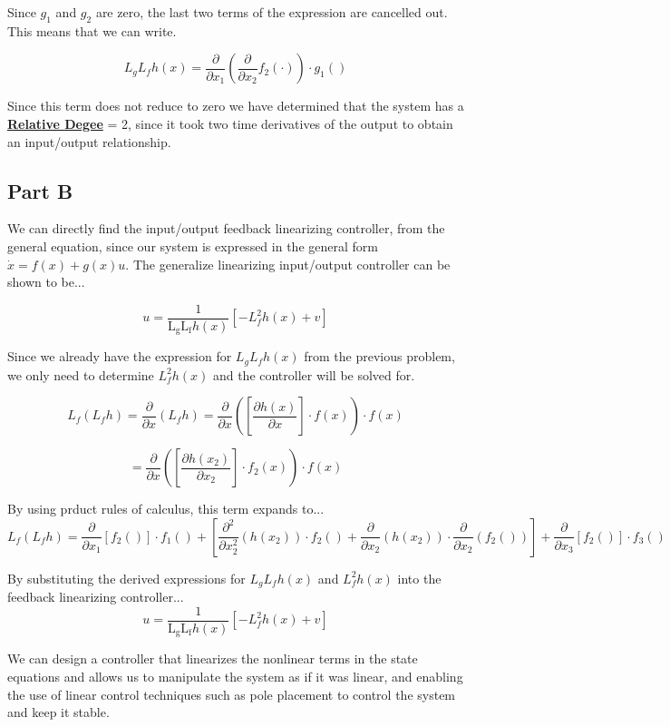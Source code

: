 \noindent Since $g_1$ and $g_2$ are zero, the last two terms of the expression are cancelled out. This means that we can write.

$$
L_gL_fh(x) = \frac{\partial}{\partial x_1}(\frac{\partial}{\partial x_2}f_2(\cdot))\cdot g_1()
$$

\noindent Since this term does not reduce to zero we have determined that the system has a \underline{\textbf{Relative Degee}} = 2, since it took two time derivatives of the output to obtain an input/output relationship.


\subsection*{Part B}

We can directly find the input/output feedback linearizing controller, from the general equation, since our system is expressed in the general form $\dot{x} = f(x) + g(x)u$. The generalize linearizing input/output controller can be shown to be...


$$
u=\frac{1}{\operatorname{L_g} \operatorname{L_f} h(x)}\left[-L^{2}_f h(x) + v\right]
$$


\noindent Since we already have the expression for $L_gL_fh(x)$ from the previous problem, we only need to determine $L^2_fh(x)$ and the controller will be solved for.

$$
L_{f}\left(L_{f} h\right)=\frac{\partial}{\partial x}\left(L_{f} h\right)=\frac{\partial}{\partial x}\left(\left[\frac{\partial h(x)}{\partial x}\right] \cdot f(x)\right) \cdot f(x)
$$


$$
= \frac{\partial}{\partial x}\left(\left[\frac{\partial h(x_2)}{\partial x_2}\right] \cdot f_2(x)\right) \cdot f(x)
$$

\noindent By using prduct rules of calculus, this term expands to...
$$
L_{f}\left(L_{f} h\right) =  \frac{\partial}{\partial x_1} \left[ f_2() \right]\cdot f_1() +  \left[ \frac{\partial^2}{\partial x_2^2} (h(x_2))\cdot f_2() + \frac{\partial}{\partial x_2} (h(x_2))\cdot \frac{\partial}{\partial x_2}(f_2()) \right]  + \frac{\partial}{\partial x_3} \left[ f_2() \right] \cdot f_3()
$$

\noindent By substituting the derived expressions for $L_gL_fh(x)$ and $L^2_fh(x)$ into the feedback linearizing controller...
$$
u=\frac{1}{\operatorname{L_g} \operatorname{L_f} h(x)}\left[-L^{2}_f h(x) + v\right]
$$

We can design a controller that linearizes the nonlinear terms in the state equations and allows us to manipulate the system as if it was linear, and enabling the use of linear control techniques such as pole placement to control the system and keep it stable.

